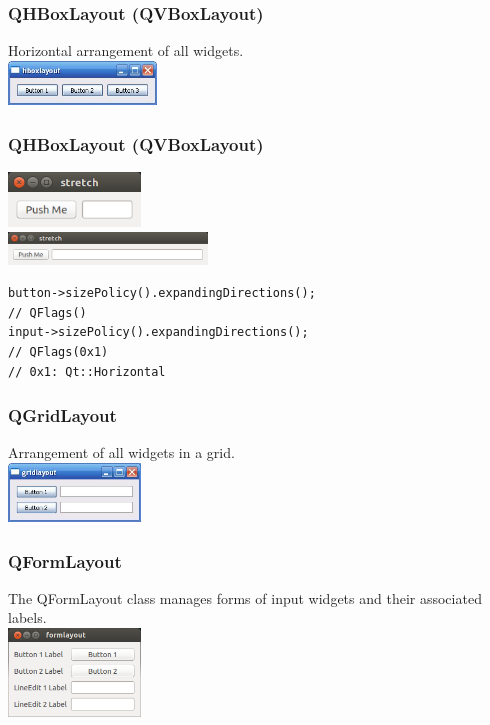 \begin{frame}[fragile]
\frametitle{QHBoxLayout (QVBoxLayout)}
Horizontal arrangement of all widgets.\\
\includegraphics[width=112pt]{code/qt/hbox/hboxlayout.jpg}\\
{\tiny

}
\end{frame}

\begin{frame}[fragile]
\frametitle{QHBoxLayout (QVBoxLayout)}
\includegraphics[width=100pt]{code/qt/stretch/stretch1.png}\\
\includegraphics[width=150pt]{code/qt/stretch/stretch2.png}\\
\begin{lstlisting}
button->sizePolicy().expandingDirections();
// QFlags()
input->sizePolicy().expandingDirections();
// QFlags(0x1)
// 0x1: Qt::Horizontal
\end{lstlisting}
\end{frame}

\frame
{
\frametitle{QGridLayout}
Arrangement of all widgets in a grid.\\
\includegraphics[width=100pt]{code/qt/grid/gridlayout.jpg}\\
{\tiny

}
}

\frame
{
\frametitle{QFormLayout}
The QFormLayout class manages forms of input widgets and their associated labels.\\
\includegraphics[width=100pt]{img/formlayout.png}\\
{\tiny

}
}

